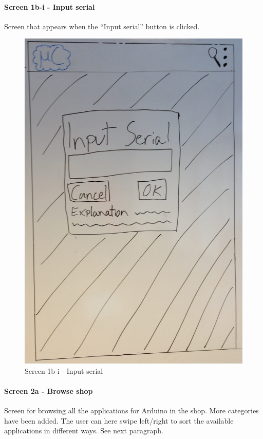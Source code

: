 \paragraph{Screen 1b-i - Input serial}
Screen that appears when the ``Input serial'' button is clicked.

\begin{figure}[H]
\centering
\includegraphics[scale=0.2]{images/Design_guide/Screen1b-i.png}
\caption{Screen 1b-i - Input serial}
\label{fig:screen1bi}
\end{figure}


\paragraph{Screen 2a - Browse shop}
Screen for browsing all the applications for Arduino in the shop. More categories have been added. The user can here swipe left/right to sort the available applications in different ways. See next paragraph.


